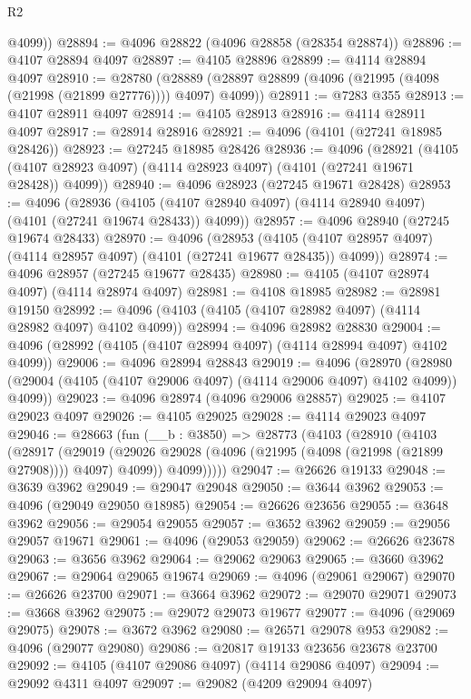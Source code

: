 \begin{lexlean}{R2}
\begin{coremodule}
        @4099))
@28894 := @4096 @28822 (@4096 @28858 (@28354 @28874))
@28896 := @4107 @28894 @4097
@28897 := @4105 @28896
@28899 := @4114 @28894 @4097
@28910 := @28780
    (@28889 (@28897 @28899 (@4096 (@21995 (@4098 (@21998 (@21899 @27776)))) @4097) @4099))
@28911 := @7283 @355
@28913 := @4107 @28911 @4097
@28914 := @4105 @28913
@28916 := @4114 @28911 @4097
@28917 := @28914 @28916
@28921 := @4096 (@4101 (@27241 @18985 @28426))
@28923 := @27245 @18985 @28426
@28936 := @4096
    (@28921 (@4105 (@4107 @28923 @4097) (@4114 @28923 @4097) (@4101 (@27241 @19671 @28428)) @4099))
@28940 := @4096 @28923 (@27245 @19671 @28428)
@28953 := @4096
    (@28936 (@4105 (@4107 @28940 @4097) (@4114 @28940 @4097) (@4101 (@27241 @19674 @28433)) @4099))
@28957 := @4096 @28940 (@27245 @19674 @28433)
@28970 := @4096
    (@28953 (@4105 (@4107 @28957 @4097) (@4114 @28957 @4097) (@4101 (@27241 @19677 @28435)) @4099))
@28974 := @4096 @28957 (@27245 @19677 @28435)
@28980 := @4105 (@4107 @28974 @4097) (@4114 @28974 @4097)
@28981 := @4108 @18985
@28982 := @28981 @19150
@28992 := @4096 (@4103 (@4105 (@4107 @28982 @4097) (@4114 @28982 @4097) @4102 @4099))
@28994 := @4096 @28982 @28830
@29004 := @4096 (@28992 (@4105 (@4107 @28994 @4097) (@4114 @28994 @4097) @4102 @4099))
@29006 := @4096 @28994 @28843
@29019 := @4096
    (@28970 (@28980 (@29004 (@4105 (@4107 @29006 @4097) (@4114 @29006 @4097) @4102 @4099)) @4099))
@29023 := @4096 @28974 (@4096 @29006 @28857)
@29025 := @4107 @29023 @4097
@29026 := @4105 @29025
@29028 := @4114 @29023 @4097
@29046 := @28663
    (fun (__b : @3850) =>
    @28773
      (@4103
        (@28910
          (@4103
            (@28917
              (@29019 (@29026 @29028 (@4096 (@21995 (@4098 (@21998 (@21899 @27908)))) @4097) @4099))
              @4099)))))
@29047 := @26626 @19133
@29048 := @3639 @3962
@29049 := @29047 @29048
@29050 := @3644 @3962
@29053 := @4096 (@29049 @29050 @18985)
@29054 := @26626 @23656
@29055 := @3648 @3962
@29056 := @29054 @29055
@29057 := @3652 @3962
@29059 := @29056 @29057 @19671
@29061 := @4096 (@29053 @29059)
@29062 := @26626 @23678
@29063 := @3656 @3962
@29064 := @29062 @29063
@29065 := @3660 @3962
@29067 := @29064 @29065 @19674
@29069 := @4096 (@29061 @29067)
@29070 := @26626 @23700
@29071 := @3664 @3962
@29072 := @29070 @29071
@29073 := @3668 @3962
@29075 := @29072 @29073 @19677
@29077 := @4096 (@29069 @29075)
@29078 := @3672 @3962
@29080 := @26571 @29078 @953
@29082 := @4096 (@29077 @29080)
@29086 := @20817 @19133 @23656 @23678 @23700
@29092 := @4105 (@4107 @29086 @4097) (@4114 @29086 @4097)
@29094 := @29092 @4311 @4097
@29097 := @29082 (@4209 @29094 @4097)

\end{coremodule}
\end{lexlean}

